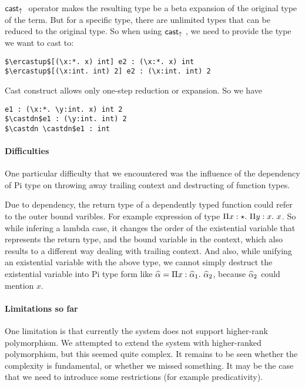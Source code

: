 $\mathsf{cast}_\uparrow~$ operator makes the resulting type be a beta expansion of
the original type of the term. But for a specific type, there are
unlimited types that can be reduced to the original type. So when
using $\mathsf{cast}_\uparrow~$, we need to provide the type we want to cast to:

\begin{lstlisting}
$\ercastup$[(\x:*. x) int] e2 : (\x:*. x) int
$\ercastup$[(\x:int. int) 2] e2 : (\x:int. int) 2
\end{lstlisting}

Cast construct allows only one-step reduction or expansion. So we have

\begin{lstlisting}
e1 : (\x:*. \y:int. x) int 2
$\castdn$e1 : (\y:int. int) 2
$\castdn \castdn$e1 : int
\end{lstlisting}

\paragraph{Difficulties}
One particular difficulty that we encountered was the influence of the dependency of Pi type on throwing away trailing context and destructing of function types.

Due to dependency, the return type of a dependently typed function could refer to the outer bound varibles. For example expression  of type $\Pi x:\star.~ {\Pi y:x.~ x}$. So while infering a lambda case, it changes the order of the existential variable that represents the return type, and the bound variable in the context, which also results to a different way dealing with trailing context. And also, while unifying an existential variable with the above type, we cannot simply destruct the existential variable into Pi type form like $\widehat{\alpha} = \Pi x:\widehat{\alpha}_1.~ {\widehat{\alpha}_2}$, because $\widehat{\alpha}_2$ could mention $x$.

\paragraph{Limitations so far}
One limitation is that currently the system does not support
higher-rank polymorphism. We attempted to extend the system
with higher-ranked polymorphism, but this seemed quite complex.
It remains to be seen whether the complexity is fundamental, or
whether we missed something. It may be the case that we need to
introduce some restrictions (for example predicativity).


